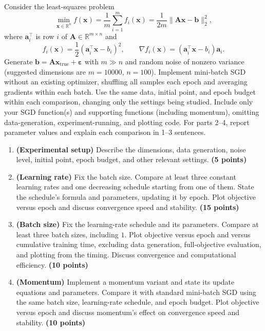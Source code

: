 \documentclass[11pt,a4paper]{article}
\begin{document}
Consider the least-squares problem
\[
    \min_{\mathbf{x}\in\mathbb{R}^n}
    f(\mathbf{x})
    =\frac{1}{m}\sum_{i=1}^m f_i(\mathbf{x})
    =\frac{1}{2m}\|\mathbf{A}\mathbf{x}-\mathbf{b}\|_2^2,
\]
where $\mathbf{a}_i^\top$ is row $i$ of
$\mathbf{A}\in\mathbb{R}^{m\times n}$ and
\[
    f_i(\mathbf{x})=\frac12(\mathbf{a}_i^\top\mathbf{x}-b_i)^2,
    \qquad
    \nabla f_i(\mathbf{x})
    =(\mathbf{a}_i^\top\mathbf{x}-b_i)\mathbf{a}_i.
\]
Generate $\mathbf{b}=\mathbf{A}\mathbf{x}_{\mathrm{true}}
+\boldsymbol{\varepsilon}$ with $m\gg n$ and random noise
of nonzero variance (suggested dimensions are $m=10000$, 
$n=100$). Implement mini-batch SGD without an existing 
optimizer, shuffling all samples each epoch and averaging 
gradients within each batch. Use the same data, initial 
point, and epoch budget within each comparison, changing 
only the settings being studied. Include only your SGD
function(s) and supporting functions (including momentum),
omitting data-generation, experiment-running, and plotting 
code. For parts 2--4, report parameter values and explain 
each comparison in 1--3 sentences.

\begin{enumerate}
    \item \textbf{(Experimental setup)}
    Describe the dimensions, data generation, noise level,
    initial point, epoch budget, and other relevant settings.
    \textbf{(5 points)}

    \item \textbf{(Learning rate)}
    Fix the batch size. Compare at least three constant
    learning rates and one decreasing schedule starting
    from one of them. State the schedule's formula and
    parameters, updating it by epoch.
    Plot objective versus epoch and discuss convergence
    speed and stability.
    \textbf{(15 points)}

    \item \textbf{(Batch size)}
    Fix the learning-rate schedule and its parameters.
    Compare at least three batch sizes, including $1$.
    Plot objective versus epoch and versus cumulative
    training time, excluding data generation, full-objective
    evaluation, and plotting from the timing.
    Discuss convergence and computational efficiency.
    \textbf{(10 points)}

    \item \textbf{(Momentum)}
    Implement a momentum variant and state its update
    equations and parameters. Compare it with standard
    mini-batch SGD using the same batch size,
    learning-rate schedule, and epoch budget.
    Plot objective versus epoch and discuss momentum's
    effect on convergence speed and stability.
    \textbf{(10 points)}
\end{enumerate}
\end{document}
